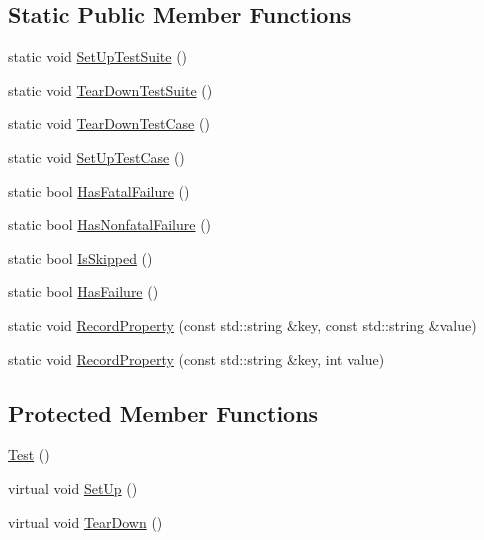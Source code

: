 \subsection*{Static Public Member Functions}
\begin{DoxyCompactItemize}
\item 
static void \hyperlink{classtesting_1_1Test_ae173b07a0fdd09fc1d417a2bb6cbdd76}{Set\+Up\+Test\+Suite} ()
\item 
static void \hyperlink{classtesting_1_1Test_a7704c8223ba28338a66ca2eaeba66383}{Tear\+Down\+Test\+Suite} ()
\item 
static void \hyperlink{classtesting_1_1Test_af374706cbaf0ffc460f4fd04e7c150f1}{Tear\+Down\+Test\+Case} ()
\item 
static void \hyperlink{classtesting_1_1Test_a5ccbac42fee8c5b00b0bfe89b6c49d79}{Set\+Up\+Test\+Case} ()
\item 
static bool \hyperlink{classtesting_1_1Test_a0a89846458f0e8ed1c9457c957e8182a}{Has\+Fatal\+Failure} ()
\item 
static bool \hyperlink{classtesting_1_1Test_a07e896f1b1836f8ac075c26d7b7c9fb8}{Has\+Nonfatal\+Failure} ()
\item 
static bool \hyperlink{classtesting_1_1Test_a1723aea1d7bd468265f4134241596752}{Is\+Skipped} ()
\item 
static bool \hyperlink{classtesting_1_1Test_a7a00be7dd0a6bfdc8d47a1b784623613}{Has\+Failure} ()
\item 
static void \hyperlink{classtesting_1_1Test_ae0448aec9e389fab70f6a75a59ff6aa2}{Record\+Property} (const std\+::string \&key, const std\+::string \&value)
\item 
static void \hyperlink{classtesting_1_1Test_af602903efb17730b977304fc56500881}{Record\+Property} (const std\+::string \&key, int value)
\end{DoxyCompactItemize}
\subsection*{Protected Member Functions}
\begin{DoxyCompactItemize}
\item 
\hyperlink{classtesting_1_1Test_a68b7618abd1fc6d13382738b0d3b5c7c}{Test} ()
\item 
virtual void \hyperlink{classtesting_1_1Test_a8b38992669fb844864807cf32e416853}{Set\+Up} ()
\item 
virtual void \hyperlink{classtesting_1_1Test_aab3c02c9f81afe1357adfc45afccd474}{Tear\+Down} ()
\end{DoxyCompactItemize}
